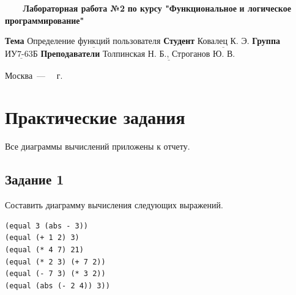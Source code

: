 \documentclass[a4paper,14pt, unknownkeysallowed]{extreport}
\begin{document}
\begin{titlepage}
	
	\begin{center}
		\noindent\begin{minipage}{1.3\textwidth}\centering
		\Large\textbf{   ~~~ Лабораторная работа №2}\newline
		\textbf{по курсу "Функциональное}\newline
		\textbf{и логическое программирование"}\newline\newline\newline
		\end{minipage}
	\end{center}
	
	\noindent\textbf{Тема} 			$\underline{\text{Определение функций пользователя}}$\newline\newline
	\noindent\textbf{Студент} 		$\underline{\text{Ковалец К. Э.}}$\newline\newline
	\noindent\textbf{Группа} 		$\underline{\text{ИУ7-63Б}}$\newline\newline
	\noindent\textbf{Преподаватели} $\underline{\text{Толпинская Н. Б., Строганов Ю. В.}}$\newline
	
	\begin{center}
		\vfill
		Москва~---~\the\year
		~г.
	\end{center}
	\restoregeometry
\end{titlepage}



\setcounter{page}{2}
\chapter{Практические задания}

Все диаграммы вычислений приложены к отчету.

\section{Задание 1}

Составить диаграмму вычисления следующих выражений.

\begin{center}
\captionsetup{justification=raggedright,singlelinecheck=off}
\begin{lstlisting}[label=lst:parallel_processing,caption=Выражения для построения диаграмм в задании 1]
(equal 3 (abs - 3)) 
(equal (+ 1 2) 3) 
(equal (* 4 7) 21)
(equal (* 2 3) (+ 7 2)) 
(equal (- 7 3) (* 3 2)) 
(equal (abs (- 2 4)) 3))
\end{lstlisting}
\end{center}
\end{document}
